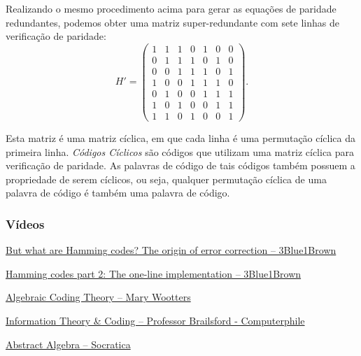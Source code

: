 \begin{frame}[allowframebreaks]
     Realizando o mesmo procedimento acima para gerar as equações de paridade redundantes, podemos obter uma
     matriz super-redundante com sete linhas de verificação de paridade:
        \begin{equation}
        H' = 
        \begin{pmatrix}
        1 & 1 & 1 & 0 & 1 & 0 & 0 \\
        0 & 1 & 1 & 1 & 0 & 1 & 0 \\
        0 & 0 & 1 & 1 & 1 & 0 & 1 \\
        1 & 0 & 0 & 1 & 1 & 1 & 0 \\
	0 & 1 & 0 & 0 & 1 & 1 & 1 \\
	1 & 0 & 1 & 0 & 0 & 1 & 1 \\
	1 & 1 & 0 & 1 & 0 & 0 & 1
        \end{pmatrix}.
        \end{equation}

     Esta matriz é uma matriz cíclica, em que cada linha é uma permutação cíclica da primeira linha.
     \textit{Códigos Cíclicos} são códigos que utilizam uma matriz cíclica para verificação de paridade.
     As palavras de código de tais códigos também possuem a propriedade de serem cíclicos, ou seja,
     qualquer permutação cíclica de uma palavra de código é também uma palavra de código.
\end{frame}

\begin{frame}
  \frametitle{Vídeos}

  \href{https://www.youtube.com/watch?v=X8jsijhllIA}{But what are Hamming codes? The origin of error correction -- 3Blue1Brown}

  \href{https://www.youtube.com/watch?v=b3NxrZOu_CE}{Hamming codes part 2: The one-line implementation -- 3Blue1Brown}

  \href{https://www.youtube.com/playlist?list=PLkvhuSoxwjI_UudECvFYArvG0cLbFlzSr}{Algebraic Coding Theory -- Mary Wootters}

  \href{https://www.youtube.com/playlist?list=PLzH6n4zXuckpKAj1_88VS-8Z6yn9zX_P6}{Information Theory \& Coding -- Professor Brailsford - Computerphile}

  \href{https://www.youtube.com/playlist?list=PLi01XoE8jYoi3SgnnGorR_XOW3IcK-TP6}{Abstract Algebra -- Socratica}

\end{frame}

